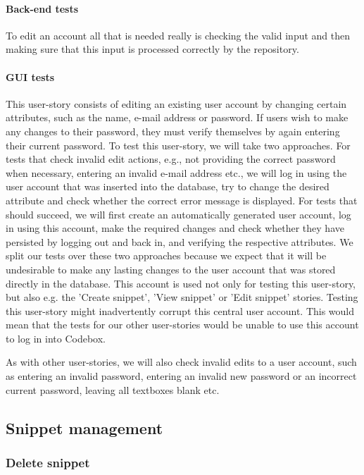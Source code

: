 \documentclass[10pt,a4paper,BCOR12mm, headexclude, footexclude,
  twoside, openright]{scrartcl}
\numberwithin{equation}{section} %
\numberwithin{figure}{section} %
\numberwithin{table}{section} %
\begin{document}
\paragraph{Back-end tests}
To edit an account all that is needed really is checking the valid input and then making sure that this input is processed correctly by the repository.

\paragraph{GUI tests}
This user-story consists of editing an existing user account by changing certain attributes, such as the name, e-mail address or password. If users wish to make any changes to their password, they must verify themselves by again entering their current password.
To test this user-story, we will take two approaches. 
For tests that check invalid edit actions, e.g., not providing the correct password when necessary, entering an invalid e-mail address etc., we will log in using the user account that was inserted into the database, try to change the desired attribute and check whether the correct error message is displayed.
For tests that should succeed, we will first create an automatically generated user account, log in using this account, make the required changes and check whether they have persisted by logging out and back in, and verifying the respective attributes.
We split our tests over these two approaches because we expect that it will be undesirable to make any lasting changes to the user account that was stored directly in the database.
This account is used not only for testing this user-story, but also e.g. the 'Create snippet', 'View snippet' or 'Edit snippet' stories.
Testing this user-story might inadvertently corrupt this central user account. This would mean that the tests for our other user-stories would be unable to use this account to log in into Codebox.

As with other user-stories, we will also check invalid edits to a user account, such as entering an invalid password, entering an invalid new password or an incorrect current password, leaving all textboxes blank etc.

\subsection{Snippet management}

\subsubsection*{Delete snippet}
\end{document}
